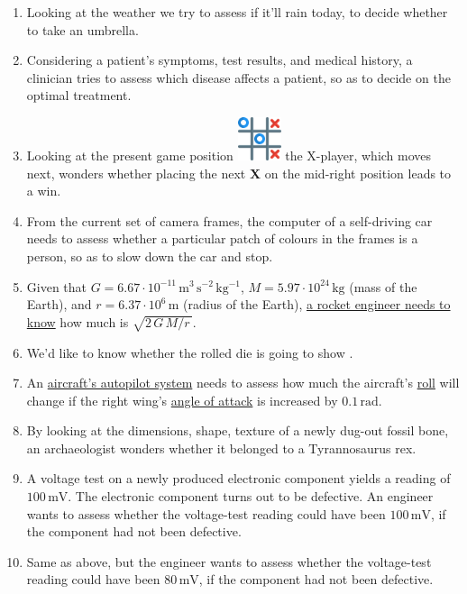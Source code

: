 \documentclass[
  a4paper,
  DIV=11,
  numbers=noendperiod,
  oneside]{scrreprt}
\begin{document}
\begin{enumerate}
\def\labelenumi{\Alph{enumi}.}
\item
  Looking at the weather we try to assess if it'll rain today, to decide
  whether to take an umbrella.
\item
  Considering a patient's symptoms, test results, and medical history, a
  clinician tries to assess which disease affects a patient, so as to
  decide on the optimal treatment.
\item
  Looking at the present game position
  \includegraphics[width=0.1\textwidth,height=\textheight]{XsOs.png} the
  X-player, which moves next, wonders whether placing the next
  {\textbf{X}} on the mid-right position leads to a win.
\item
  From the current set of camera frames, the computer of a self-driving
  car needs to assess whether a particular patch of colours in the
  frames is a person, so as to slow down the car and stop.
\item
  Given that {\(G=6.67 \cdot 10^{-11}\,\mathrm{m^3\,s^{-2}\,kg^{-1}}\),}
  \(M = 5.97 \cdot 10^{24}\,\mathrm{kg}\) (mass of the Earth), and
  \(r = 6.37 \cdot 10^{6}\,\mathrm{m}\) (radius of the Earth),
  \href{http://nasaphysics.cet.edu/escape-velocity.html}{a rocket
  engineer needs to know} how much is {\(\sqrt{2\,G\,M/r\,}\).}
\item
  We'd like to know whether the rolled die is going to show
  .
\item
  An
  \href{https://aerospaceamerica.aiaa.org/features/a-i-in-the-cockpit}{aircraft's
  autopilot system} needs to assess how much the aircraft's
  \href{https://www.grc.nasa.gov/www/k-12/VirtualAero/BottleRocket/airplane/roll.html}{roll}
  will change if the right wing's
  \href{https://www.grc.nasa.gov/www/k-12/VirtualAero/BottleRocket/airplane/incline.html}{angle
  of attack} is increased by \(0.1\,\mathrm{rad}\).
\item
  By looking at the dimensions, shape, texture of a newly dug-out fossil
  bone, an archaeologist wonders whether it belonged to a Tyrannosaurus
  rex.
\item
  A voltage test on a newly produced electronic component yields a
  reading of \(100\,\mathrm{mV}\). The electronic component turns out to
  be defective. An engineer wants to assess whether the voltage-test
  reading could have been \(100\,\mathrm{mV}\), if the component had not
  been defective.
\item
  Same as above, but the engineer wants to assess whether the
  voltage-test reading could have been \(80\,\mathrm{mV}\), if the
  component had not been defective.
\end{enumerate}
\end{document}
